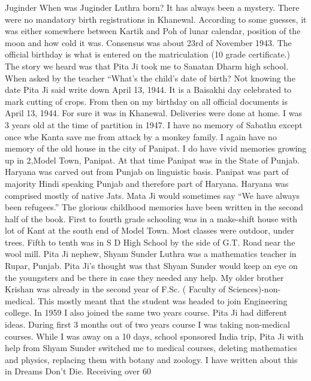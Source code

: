 Juginder 
When was Juginder Luthra born? It has always been a mystery. There were no mandatory birth registrations in Khanewal. According to some guesses, it was either somewhere between Kartik and Poh of lunar calendar, position of the moon and how cold it was. Consensus was about 23rd of November 1943. 
The official birthday is what is entered on the matriculation (10 grade certificate.) The story we heard was that Pita Ji took me to Sanatan Dharm high school. When asked by the teacher “What’s the child’s date of birth? Not knowing the date Pita Ji said write down April 13, 1944. It is a Baisakhi day celebrated to mark cutting of crops. From then on my birthday on all official documents is April 13, 1944. 
For sure it was in Khanewal. Deliveries were done at home. I was 3 years old at the time of partition in 1947. I have no memory of Sabathu except once whe Kanta save me from attack by a monkey family. I again have no memory of the old house in the city of Panipat. I do have vivid memories growing up in 2,Model Town, Panipat. At that time Panipat was in the State of Punjab. Haryana was carved out from Punjab on linguistic basis. Panipat was part of majority Hindi speaking Punjab and therefore part of Haryana. Haryana was comprised mostly of native Jats. Mata Ji would sometimes say “We have always been refugees.” The glorious childhood memories have been written in the second half of the book. First to fourth grade schooling was in a make-shift house with lot of Kant at the south end of Model Town. Most classes were outdoor, under trees. Fifth to tenth was in S D High School by the side of G.T. Road near the wool mill. 
Pita Ji nephew, Shyam Sunder Luthra was a mathematics teacher in Rupar, Punjab. Pita Ji’s thought was that Shyam Sunder would keep an eye on the youngsters and be there in case they needed any help. My older brother Krishan was already in the second year of F.Sc. ( Faculty of Sciences)-non-medical. This mostly meant that the student was headed to join Engineering college. 
In 1959 I also joined the same two years course. Pita Ji had different ideas. During first 3 months out of two years course I was taking non-medical courses. While I was away on a 10 days, school sponsored India trip, Pita Ji with help from Shyam Sunder switched me to medical courses, deleting mathematics and physics, replacing them with botany and zoology. 
I have written about this in Dreams Don’t Die. 
Receiving over 60%
